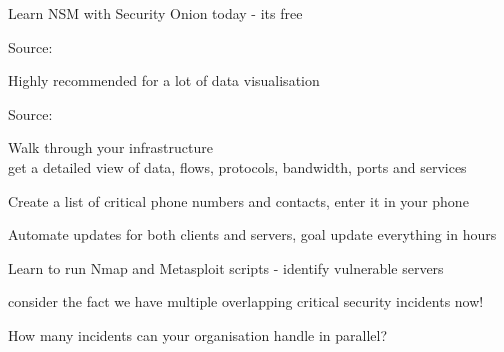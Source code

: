 \documentclass[20pt,landscape,a4paper]{foils}
\begin{document}
\centerline{Learn NSM with Security Onion today - its free}

Source:\\




\centerline{Highly recommended for a lot of data visualisation}

Source:


\begin{list2}
\item Walk through your infrastructure\\
get a detailed view of data, flows, protocols, bandwidth, ports and services

\item Create a list of critical phone numbers and contacts, enter it in your phone
\item Automate updates for both clients and servers, goal update everything in hours
\item Learn to run Nmap and Metasploit scripts - identify vulnerable servers
\end{list2}

\vskip 2cm
\centerline{consider the fact we have multiple overlapping critical security incidents now!}

\vskip 2cm
How many incidents can your organisation handle in parallel?


\myquestionspage
\end{document}
